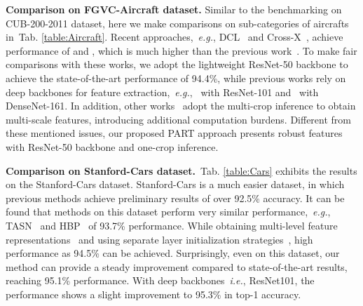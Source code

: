 \documentclass[journal]{IEEEtran}
\def\ie{{\em i.e.}}
\def\eg{{\em e.g.}}
\newcommand{\tabref}[1]{Tab. \ref{#1}}
\begin{document}
\textbf{Comparison on FGVC-Aircraft dataset.} Similar to the benchmarking on CUB-200-2011 dataset, here we make comparisons on sub-categories of aircrafts in~\tabref{table:Aircraft}. Recent approaches,~\eg, DCL~\cite{chen2019destruction} and Cross-X~\cite{luo2019cross}, achieve performance of  and , which is much higher than the previous work~\cite{lin2015bilinear}. To make fair comparisons with these works, we adopt the lightweight ResNet-50 backbone to achieve the state-of-the-art performance of 94.4\%, while previous works rely on deep backbones for feature extraction,~\eg,~\cite{gao2020channel} with ResNet-101 and~\cite{dubey2018pairwise,dubey2018maximum} with DenseNet-161. In addition, other works~\cite{fu2017look,zheng2017learning,yang2018learning} adopt the multi-crop inference to obtain multi-scale features, introducing additional computation burdens. Different from these mentioned issues, our proposed PART approach presents robust features with ResNet-50 backbone and one-crop inference.

\textbf{Comparison on Stanford-Cars dataset.}~\tabref{table:Cars} exhibits the results on the Stanford-Cars dataset. Stanford-Cars is a much easier dataset, in which previous methods achieve preliminary results of over 92.5\% accuracy. It can be found that methods on this dataset perform very similar performance,~\eg, TASN~\cite{zheng2019looking} and HBP~\cite{yu2018hierarchical} of 93.7\% performance. While obtaining multi-level feature representations~\cite{luo2019cross} and using separate layer initialization strategies~\cite{wang2018learning}, high performance as 94.5\% can be achieved. Surprisingly, even on this dataset, our method can provide a steady improvement compared to state-of-the-art results, reaching 95.1\% performance. With deep backbones~\ie, ResNet101, the performance shows a slight improvement to 95.3\% in top-1 accuracy.
\end{document}
